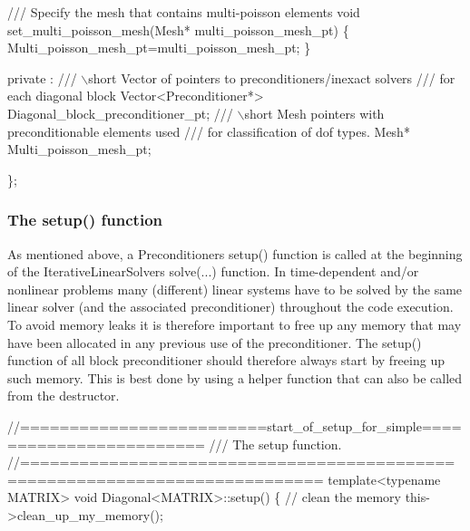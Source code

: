 \begin{DoxyCodeInclude}
\textcolor{comment}{}
\textcolor{comment}{  /// Specify the mesh that contains multi-poisson elements}
\textcolor{comment}{}  \textcolor{keywordtype}{void} set\_multi\_poisson\_mesh(Mesh* multi\_poisson\_mesh\_pt)
  \{
   Multi\_poisson\_mesh\_pt=multi\_poisson\_mesh\_pt;
  \}

 private :
  \textcolor{comment}{}
\textcolor{comment}{  /// \(\backslash\)short Vector of pointers to preconditioners/inexact solvers }
\textcolor{comment}{  /// for each diagonal block}
\textcolor{comment}{}  Vector<Preconditioner*> Diagonal\_block\_preconditioner\_pt;
  \textcolor{comment}{}
\textcolor{comment}{  /// \(\backslash\)short Mesh pointers with preconditionable elements used}
\textcolor{comment}{  /// for classification of dof types.}
\textcolor{comment}{}  Mesh* Multi\_poisson\_mesh\_pt;

 \};

\end{DoxyCodeInclude}
\hypertarget{index_diag_setup}{}\subsubsection{The setup() function}\label{index_diag_setup}
As mentioned above, a {\ttfamily Preconditioner\textquotesingle{}s} {\ttfamily setup()} function is called at the beginning of the {\ttfamily Iterative\+Linear\+Solver\textquotesingle{}s} {\ttfamily solve}(...) function. In time-\/dependent and/or nonlinear problems many (different) linear systems have to be solved by the same linear solver (and the associated preconditioner) throughout the code execution. To avoid memory leaks it is therefore important to free up any memory that may have been allocated in any previous use of the preconditioner. The {\ttfamily setup()} function of all block preconditioner should therefore always start by freeing up such memory. This is best done by using a helper function that can also be called from the destructor.


\begin{DoxyCodeInclude}
 \textcolor{comment}{//=========================start\_of\_setup\_for\_simple========================}\textcolor{comment}{}
\textcolor{comment}{ /// The setup function.}
\textcolor{comment}{} \textcolor{comment}{//============================================================================}
 \textcolor{keyword}{template}<\textcolor{keyword}{typename} MATRIX> 
 \textcolor{keywordtype}{void} Diagonal<MATRIX>::setup()
 \{
  \textcolor{comment}{// clean the memory}
  this->clean\_up\_my\_memory();

\end{DoxyCodeInclude}


